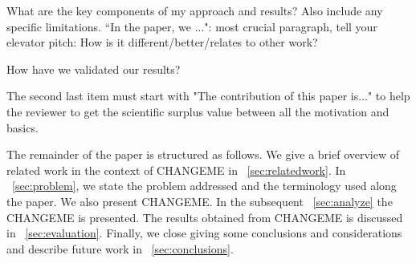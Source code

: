 What are the key components of my approach and results? Also include any
specific limitations. ``In the paper, we ...": most crucial paragraph, tell
your elevator pitch: How is it different/better/relates to other work?

How have we validated our results?

The second last item must start with "The contribution of this paper
is..." to help the reviewer to get the scientific surplus value between all
the motivation and basics.

The remainder of the paper is structured as follows. We give a brief overview of
related work in the context of CHANGEME
in \sectionname~\ref{sec:relatedwork}. In \sectionname~\ref{sec:problem}, we
state the problem addressed and the terminology used along the paper. We also
present CHANGEME. In the subsequent \sectionname~\ref{sec:analyze} the
CHANGEME is presented. The results obtained from CHANGEME is discussed in
\sectionname~\ref{sec:evaluation}. Finally, we close giving some conclusions
and considerations and describe future work in
\sectionname~\ref{sec:conclusions}.
